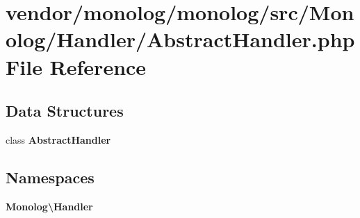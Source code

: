 \section{vendor/monolog/monolog/src/\+Monolog/\+Handler/\+Abstract\+Handler.php File Reference}
\label{_abstract_handler_8php}
\subsection*{Data Structures}
\begin{DoxyCompactItemize}
\item 
class {\bf Abstract\+Handler}
\end{DoxyCompactItemize}
\subsection*{Namespaces}
\begin{DoxyCompactItemize}
\item 
 {\bf Monolog\textbackslash{}\+Handler}
\end{DoxyCompactItemize}
